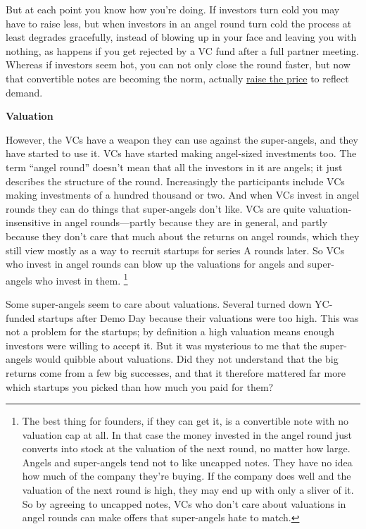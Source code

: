 But at each point you know how you're doing. If investors turn cold you
may have to raise less, but when investors in an angel round turn cold
the process at least degrades gracefully, instead of blowing up in your
face and leaving you with nothing, as happens if you get rejected by a
VC fund after a full partner meeting. Whereas if investors seem hot, you
can not only close the round faster, but now that convertible notes are
becoming the norm, actually \href{hiresfund.html}{raise the price} to
reflect demand.

\textbf{Valuation}

However, the VCs have a weapon they can use against the super-angels,
and they have started to use it. VCs have started making angel-sized
investments too. The term ``angel round'' doesn't mean that all the
investors in it are angels; it just describes the structure of the
round. Increasingly the participants include VCs making investments of a
hundred thousand or two. And when VCs invest in angel rounds they can do
things that super-angels don't like. VCs are quite valuation-insensitive
in angel rounds---partly because they are in general, and partly because
they don't care that much about the returns on angel rounds, which they
still view mostly as a way to recruit startups for series A rounds
later. So VCs who invest in angel rounds can blow up the valuations for
angels and super-angels who invest in them. \footnote{The best thing for founders, if they can get it, is a
convertible note with no valuation cap at all. In that case the money
invested in the angel round just converts into stock at the valuation of
the next round, no matter how large. Angels and super-angels tend not to
like uncapped notes. They have no idea how much of the company they're
buying. If the company does well and the valuation of the next round is
high, they may end up with only a sliver of it. So by agreeing to
uncapped notes, VCs who don't care about valuations in angel rounds can
make offers that super-angels hate to match.}

Some super-angels seem to care about valuations. Several turned down
YC-funded startups after Demo Day because their valuations were too
high. This was not a problem for the startups; by definition a high
valuation means enough investors were willing to accept it. But it was
mysterious to me that the super-angels would quibble about valuations.
Did they not understand that the big returns come from a few big
successes, and that it therefore mattered far more which startups you
picked than how much you paid for them?

